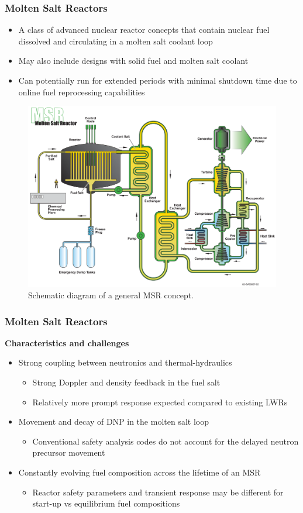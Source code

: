 \begin{frame}
	\frametitle{Molten Salt Reactors}
		\begin{itemize}
			\item A class of advanced nuclear reactor concepts that contain
			nuclear fuel dissolved and circulating in a molten salt coolant
			loop
			\item May also include designs with solid fuel and molten salt
			coolant
			\item Can potentially run for extended periods with minimal shutdown
			time due to online fuel reprocessing capabilities
		\end{itemize}
		\begin{figure}
			\centering
			\includegraphics[width=.5\textwidth]{./images/msr}
			\caption{Schematic diagram of a general \gls{MSR} concept.}
			\label{fig:msr}
		\end{figure}
\end{frame}

\begin{frame}
	\frametitle{Molten Salt Reactors}
		\textbf{Characteristics and challenges}
		\begin{itemize}
			\item Strong coupling between neutronics and thermal-hydraulics
			\begin{itemize}
				\item Strong Doppler and density feedback in the fuel salt
				\item Relatively more prompt response expected compared to
				existing LWRs
			\end{itemize}
			\item Movement and decay of \gls{DNP} in the molten
			salt loop
			\begin{itemize}
				\item Conventional safety analysis codes do not account for the
				delayed neutron precursor movement
			\end{itemize}
			\item Constantly evolving fuel composition across the lifetime of an
			\gls{MSR}
			\begin{itemize}
				\item Reactor safety parameters and transient response may be
				different for start-up vs equilibrium fuel compositions
			\end{itemize}
		\end{itemize}
\end{frame}
